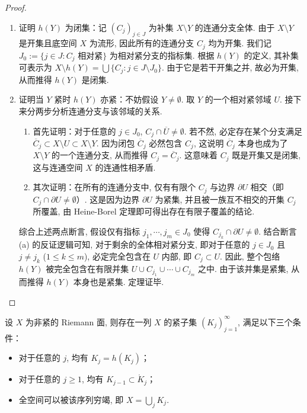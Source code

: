 \begin{proof}
    \begin{enumerate}
        \item \qquad 证明 $h(Y)$ 为闭集：记 $(C_j)_{j \in J}$ 为补集 $X \setminus Y$ 的连通分支全体. 由于 $X \setminus Y$ 是开集且底空间 $X$ 为流形, 因此所有的连通分支 $C_j$ 均为开集. 我们记 $J_0 := \{j \in J : C_j \text{ 相对紧}\}$ 为相对紧分支的指标集. 根据 $h(Y)$ 的定义, 其补集可表示为 $X \setminus h(Y) = \bigcup \{C_j : j \in J \setminus J_0\}$. 由于它是若干开集之并, 故必为开集, 从而推得 $h(Y)$ 是闭集. 
\item \qquad 证明当 $Y$ 紧时 $h(Y)$ 亦紧：不妨假设 $Y \neq \emptyset$. 取 $Y$ 的一个相对紧邻域 $U$. 接下来分两步分析连通分支与该邻域的关系. 
\begin{enumerate}
    \item 首先证明：对于任意的 $j \in J_0$, $C_j \cap \overline{U} \neq \emptyset$. 若不然, 必定存在某个分支满足 $\overline{C}_j \subset X \setminus U \subset X \setminus Y$. 因为闭包 $\overline{C}_j$ 必然包含 $C_j$, 这说明 $\overline{C}_j$ 本身也成为了 $X \setminus Y$ 的一个连通分支, 从而推得 $C_j = \overline{C}_j$. 这意味着 $C_j$ 既是开集又是闭集, 这与连通空间 $X$ 的连通性相矛盾. 
\item 其次证明：在所有的连通分支中, 仅有有限个 $C_j$ 与边界 $\partial U$ 相交（即 $C_j \cap \partial U \neq \emptyset$）. 这是因为边界 $\partial U$ 为紧集, 并且被一族互不相交的开集 $C_j$ 所覆盖, 由 Heine-Borel 定理即可得出存在有限子覆盖的结论. 
\end{enumerate}
\qquad 综合上述两点断言, 假设仅有指标 $j_1, \cdots, j_m \in J_0$ 使得 $C_{j_k} \cap \partial U \neq \emptyset$. 结合断言 (a) 的反证逻辑可知, 对于剩余的全体相对紧分支, 即对于任意的 $j \in J_0$ 且 $j \neq j_k$ ($1 \leqslant k \leqslant m$), 必定完全包含在 $U$ 内部, 即 $C_j \subset U$. 因此, 整个包络 $h(Y)$ 被完全包含在有限并集 $U \cup C_{j_1} \cup \cdots \cup C_{j_m}$ 之中. 由于该并集是紧集, 从而推得 $h(Y)$ 本身也是紧集. 定理证毕. 
    \end{enumerate}
\end{proof}

\begin{corollary}
设 $X$ 为非紧的 Riemann 面, 则存在一列 $X$ 的紧子集 $(K_j)_{j=1}^\infty$, 满足以下三个条件：
\begin{itemize}
    \item [(1)] 对于任意的 $j$, 均有 $K_j = h(K_j)$；
    \item [(2)] 对于任意的 $j \geqslant 1$, 均有 $K_{j-1} \subset \mathring{K}_j$；
    \item [(3)] 全空间可以被该序列穷竭, 即 $X = \bigcup_j K_j$. 
\end{itemize}
\end{corollary}

